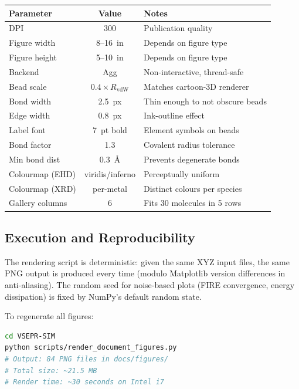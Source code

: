 \documentclass[11pt,a4paper]{article}
\begin{document}
\begin{center}
\begin{tabular}{lcp{7cm}}
\toprule
\textbf{Parameter} & \textbf{Value} & \textbf{Notes} \\
\midrule
DPI              & 300            & Publication quality \\
Figure width     & 8--16~in       & Depends on figure type \\
Figure height    & 5--10~in       & Depends on figure type \\
Backend          & Agg            & Non-interactive, thread-safe \\
Bead scale       & $0.4 \times R_{\text{vdW}}$ & Matches cartoon-3D renderer \\
Bond width       & 2.5~px         & Thin enough to not obscure beads \\
Edge width       & 0.8~px         & Ink-outline effect \\
Label font       & 7~pt bold      & Element symbols on beads \\
Bond factor      & 1.3            & Covalent radius tolerance \\
Min bond dist    & 0.3~\AA        & Prevents degenerate bonds \\
Colourmap (EHD)  & viridis/inferno & Perceptually uniform \\
Colourmap (XRD)  & per-metal      & Distinct colours per species \\
Gallery columns  & 6              & Fits 30 molecules in 5 rows \\
\bottomrule
\end{tabular}
\end{center}

\subsection{Execution and Reproducibility}

The rendering script is deterministic: given the same XYZ input files,
the same PNG output is produced every time (modulo Matplotlib version
differences in anti-aliasing).  The random seed for noise-based plots
(FIRE convergence, energy dissipation) is fixed by NumPy's default
random state.

To regenerate all figures:

\begin{lstlisting}[language=bash,title={\textbf{Regenerate all document figures}}]
cd VSEPR-SIM
python scripts/render_document_figures.py
# Output: 84 PNG files in docs/figures/
# Total size: ~21.5 MB
# Render time: ~30 seconds on Intel i7
\end{lstlisting}
\end{document}
